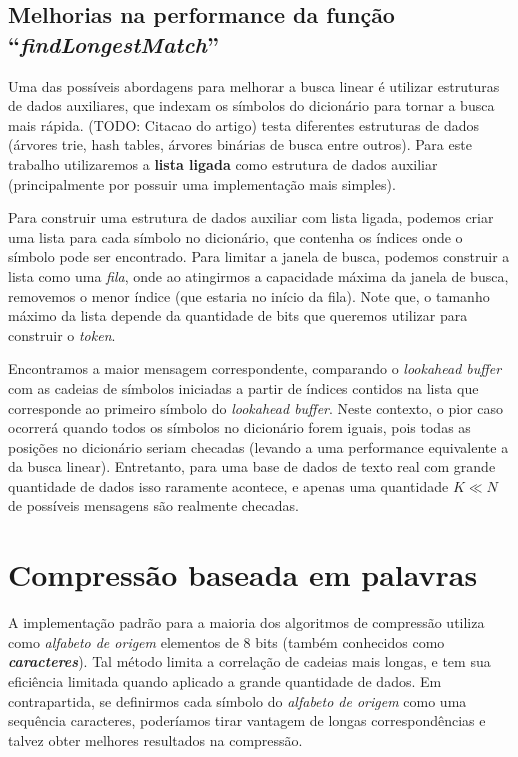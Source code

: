 \subsection{Melhorias na performance da função ``\emph{findLongestMatch}'' }

Uma das possíveis abordagens para melhorar a busca linear é utilizar estruturas de dados auxiliares, que indexam os símbolos do dicionário para tornar a busca mais rápida.
(TODO: Citacao do artigo) testa diferentes estruturas de dados (árvores trie, hash tables, árvores binárias de busca entre outros). 
Para este trabalho utilizaremos a \textbf{lista ligada} como estrutura de dados auxiliar (principalmente por possuir uma implementação mais simples). 

Para construir uma estrutura de dados auxiliar com lista ligada, podemos criar uma lista para cada símbolo no dicionário, que contenha os índices onde o símbolo pode ser encontrado.  
Para limitar a janela de busca, podemos construir a lista como uma \emph{fila}, onde ao atingirmos a capacidade máxima da janela de busca, removemos o menor índice (que estaria no início da fila). 
Note que, o tamanho máximo da lista depende da quantidade de bits que queremos utilizar para construir o \emph{token}.

Encontramos a maior mensagem correspondente, comparando o \emph{lookahead buffer} com as cadeias de símbolos iniciadas a partir de índices contidos na lista que corresponde ao primeiro símbolo do \emph{lookahead buffer}.
Neste contexto, o pior caso ocorrerá quando todos os símbolos no dicionário forem iguais, pois todas as posições no dicionário seriam checadas (levando a uma performance equivalente a da busca linear).
Entretanto, para uma base de dados de texto real com grande quantidade de dados isso raramente acontece, e apenas uma quantidade $K \ll N$ de possíveis mensagens são realmente checadas.

\section{Compressão baseada em palavras}
A implementação padrão para a maioria dos algoritmos de compressão utiliza como \emph{alfabeto de origem} elementos de 8 bits (também conhecidos como \textbf{\emph{caracteres}}).
Tal método limita a correlação de cadeias mais longas, e tem sua eficiência limitada quando aplicado a grande quantidade de dados. 
Em contrapartida, se definirmos cada símbolo do \emph{alfabeto de origem} como uma sequência caracteres, poderíamos tirar vantagem de longas correspondências e talvez obter melhores resultados na compressão.

